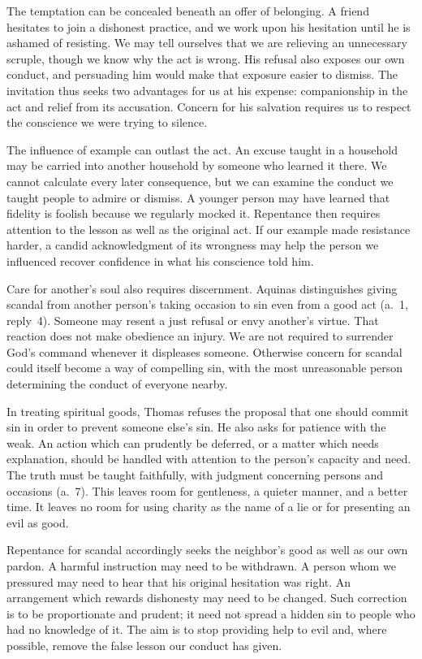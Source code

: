 The temptation can be concealed beneath an offer of belonging. A friend hesitates to join a dishonest practice, and we work upon his hesitation until he is ashamed of resisting. We may tell ourselves that we are relieving an unnecessary scruple, though we know why the act is wrong. His refusal also exposes our own conduct, and persuading him would make that exposure easier to dismiss. The invitation thus seeks two advantages for us at his expense: companionship in the act and relief from its accusation. Concern for his salvation requires us to respect the conscience we were trying to silence.

The influence of example can outlast the act. An excuse taught in a household may be carried into another household by someone who learned it there. We cannot calculate every later consequence, but we can examine the conduct we taught people to admire or dismiss. A younger person may have learned that fidelity is foolish because we regularly mocked it. Repentance then requires attention to the lesson as well as the original act. If our example made resistance harder, a candid acknowledgment of its wrongness may help the person we influenced recover confidence in what his conscience told him.

Care for another's soul also requires discernment. Aquinas distinguishes giving scandal from another person's taking occasion to sin even from a good act (a.~1, reply~4). Someone may resent a just refusal or envy another's virtue. That reaction does not make obedience an injury. We are not required to surrender God's command whenever it displeases someone. Otherwise concern for scandal could itself become a way of compelling sin, with the most unreasonable person determining the conduct of everyone nearby.

In treating spiritual goods, Thomas refuses the proposal that one should commit sin in order to prevent someone else's sin. He also asks for patience with the weak. An action which can prudently be deferred, or a matter which needs explanation, should be handled with attention to the person's capacity and need. The truth must be taught faithfully, with judgment concerning persons and occasions (a.~7). This leaves room for gentleness, a quieter manner, and a better time. It leaves no room for using charity as the name of a lie or for presenting an evil as good.

Repentance for scandal accordingly seeks the neighbor's good as well as our own pardon. A harmful instruction may need to be withdrawn. A person whom we pressured may need to hear that his original hesitation was right. An arrangement which rewards dishonesty may need to be changed. Such correction is to be proportionate and prudent; it need not spread a hidden sin to people who had no knowledge of it. The aim is to stop providing help to evil and, where possible, remove the false lesson our conduct has given.


